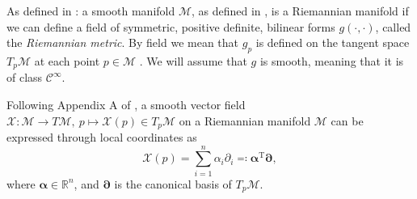 \begin{definition}\label{def:tangent_space}
    
\end{definition}

\begin{definition}\label{def:riemannian_manifold}
    As defined in \cite[def~2.6,~p.~179]{Boothby1975}: a \textup{smooth manifold} $\mathcal{M}$, as defined in \cite[p.~13]{Lee2012:1},  is a \textup{Riemannian manifold} if we can define a field of symmetric, positive definite, bilinear forms $g(\cdot,\cdot)$, called the \textit{Riemannian metric}. By field we mean that $g_p$ is defined on the tangent space $T_p\mathcal{M}$ at each point $p\in \mathcal{M}$ \cite[def~2.1,~p.~178]{Boothby1975}. We will assume that $g$ is smooth, meaning that it is of class $\mathcal{C}^\infty$.
\end{definition}


\begin{definition}\label{def:vector_field_on_manifold}
    Following Appendix A of \cite{JensenZimmermann2024}, a smooth vector field $\mathcal{X}:\mathcal{M}\xrightarrow{}T \mathcal{M},~p\mapsto \mathcal{X}(p)\in T_{p}\mathcal{M}$ on a Riemannian manifold $\mathcal{M}$ can be expressed through local coordinates as 
    \begin{equation*}
        \mathcal{X}(p)=\sum\limits_{i=1}^{n}\alpha_{i}\partial_{i}\eqqcolon \mathbf{\alpha}^{\mathrm{T}}\mathbf{\partial},
    \end{equation*}
    where $\mathbf{\alpha}\in \mathbb{R}^{n}$, and $\mathbf{\partial}$ is the canonical basis of $T_{p}\mathcal{M}$.
    
\end{definition}

